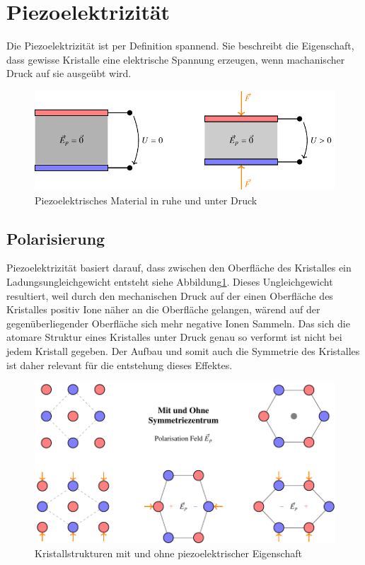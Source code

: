 \section{Piezoelektrizität}
Die Piezoelektrizität ist per Definition spannend.
Sie beschreibt die Eigenschaft, dass gewisse Kristalle eine elektrische Spannung erzeugen, wenn machanischer Druck auf sie ausgeübt wird.

\begin{figure}
    \centering
    \includegraphics[]{papers/punktgruppen/figures/piezo} %
    \caption{Piezoelektrisches Material in ruhe und unter Druck}
    \label{fig:punktgruppen:basicPiezo}
\end{figure}

\subsection{Polarisierung}
Piezoelektrizität basiert darauf, dass zwischen den Oberfläche des Kristalles ein Ladungsungleichgewicht entsteht siehe Abbildung\ref{fig:punktgruppen:basicPiezo}.
Dieses Ungleichgewicht resultiert, 
weil durch den mechanischen Druck auf der einen Oberfläche des Kristalles positiv Ione näher an die Oberfläche gelangen,
wärend auf der gegenüberliegender Oberfläche sich mehr negative Ionen Sammeln.
Das sich die atomare Struktur eines Kristalles unter Druck genau so verformt ist nicht bei jedem Kristall gegeben.
Der Aufbau und somit auch die Symmetrie des Kristalles ist daher relevant für die entstehung dieses Effektes.

\begin{figure}
    \centering
    \includegraphics[]{papers/punktgruppen/figures/piezo-atoms} 
    \caption{Kristallstrukturen mit und ohne piezoelektrischer Eigenschaft}
    \label{fig:punktgruppen:atomPiezo}
\end{figure}

